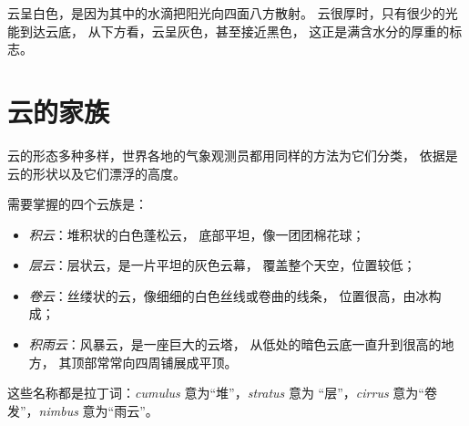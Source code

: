 云呈白色，是因为其中的水滴把阳光向四面八方散射。
云很厚时，只有很少的光能到达云底，
从下方看，云呈灰色，甚至接近黑色，
这正是满含水分的厚重的标志。

\section{云的家族}

云的形态多种多样，世界各地的气象观测员都用同样的方法为它们分类，
依据是云的形状以及它们漂浮的高度。

\begin{definition}[云族]\label{def:g4:clouds-rain-snow:cloud-families}
需要掌握的四个云族是：
\begin{itemize}
  \item \emph{积云}：堆积状的白色蓬松云，
        底部平坦，像一团团棉花球；
  \item \emph{层云}：层状云，是一片平坦的灰色云幕，
        覆盖整个天空，位置较低；
  \item \emph{卷云}：丝缕状的云，像细细的白色丝线或卷曲的线条，
        位置很高，由冰构成；
  \item \emph{积雨云}：风暴云，是一座巨大的云塔，
        从低处的暗色云底一直升到很高的地方，
        其顶部常常向四周铺展成平顶。
\end{itemize}
\end{definition}

这些名称都是拉丁词：\emph{cumulus} 意为“堆”，\emph{stratus} 意为
“层”，\emph{cirrus} 意为“卷发”，\emph{nimbus} 意为“雨云”。

